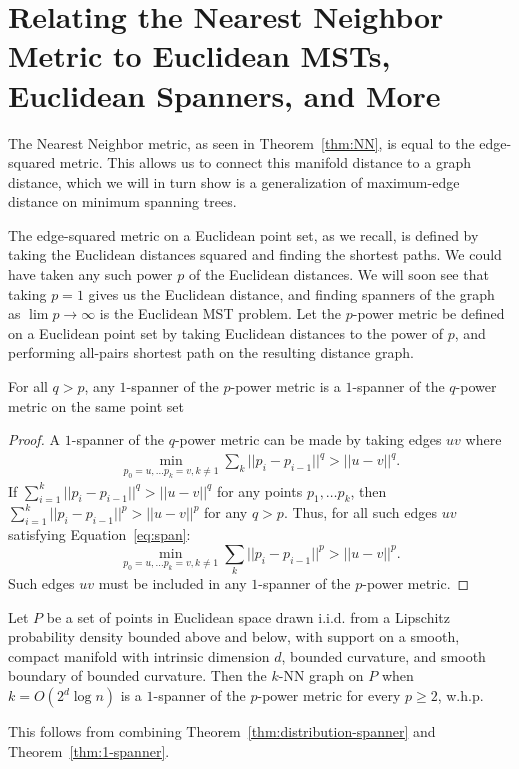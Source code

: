 \section{Relating the Nearest Neighbor Metric to Euclidean MSTs,
Euclidean Spanners, and More}\label{sec:edge-power}
The Nearest Neighbor metric, as seen in Theorem~\ref{thm:NN}, is equal to
the edge-squared metric. This allows us to connect this manifold distance
to a graph distance, which we will in turn show is a generalization of
maximum-edge distance on minimum spanning trees.

The edge-squared metric on a Euclidean point set, as we recall, is defined by taking the
Euclidean distances squared and finding the shortest paths. 
We could have taken any such power $p$ of the Euclidean distances. We
will soon see that taking $p = 1$ gives us the Euclidean distance, and
finding spanners of the graph as $\lim p\rightarrow \infty$ is the
Euclidean MST problem.  
Let the $p$-power metric be defined on a Euclidean point set by taking
Euclidean distances to the power of $p$, and performing all-pairs
shortest path on the resulting distance graph.
\begin{theorem} \label{thm:1-spanner}
For all $q > p$, any $1$-spanner of the $p$-power metric is a
$1$-spanner of the $q$-power metric on the same point set
\end{theorem}
\begin{proof}
A $1$-spanner of the $q$-power metric can be made by taking
  edges $uv$ where
  \begin{align}\label{eq:span}
    \min_{p_0=u, \ldots p_k=v, k \not= 1} \sum_k ||p_i - p_{i-1}||^q > || u -
v||^q.
  \end{align}
If
  $\sum_{i=1}^k ||p_i - p_{i-1}||^q > || u - v||^q$ for any points
  $p_1, \ldots p_k$, then
  $\sum_{i=1}^k ||p_i - p_{i-1}||^p > || u - v||^p$ for any $q > p$.
  Thus, for all such edges $uv$ satisfying
  Equation~\ref{eq:span}:
  \[ \min_{p_0=u, \ldots p_k=v, k \not= 1} \sum_k ||p_i - p_{i-1}||^p > || u -
  v||^p. \] Such edges $uv$ must be included in any $1$-spanner
  of the $p$-power
  metric.
\end{proof}

 \begin{corollary}
   Let $P$ be a set of points in Euclidean space drawn i.i.d. from a Lipschitz
   probability density bounded above and below, with support on a
   smooth, compact manifold with intrinsic dimension $d$, bounded
   curvature, and
   smooth boundary of bounded curvature. Then the $k$-NN graph on $P$
   when $k = O(2^d \log n)$ is a $1$-spanner of the $p$-power
   metric for every $p \geq 2$, w.h.p.
 \end{corollary}
This follows from combining Theorem~\ref{thm:distribution-spanner} and
Theorem~\ref{thm:1-spanner}.
